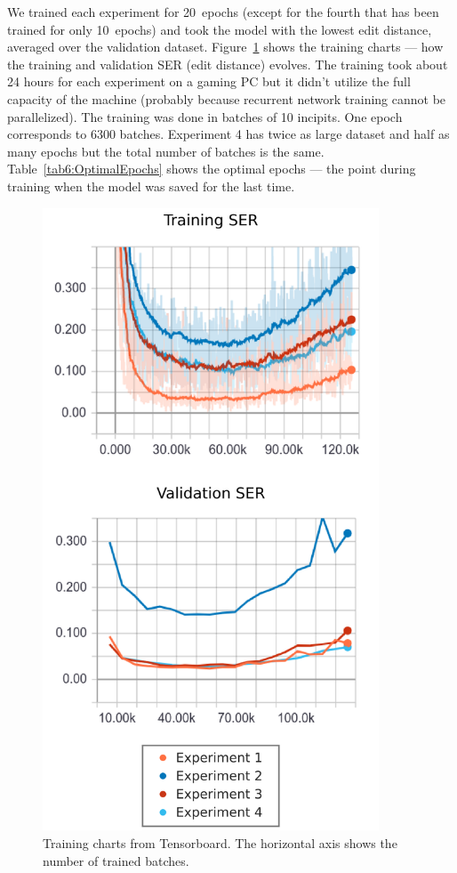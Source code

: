 We trained each experiment for 20~epochs (except for the fourth that has been trained for only 10~epochs) and took the model with the lowest edit distance, averaged over the validation dataset. Figure~\ref{fig6:TrainingCharts} shows the training charts --- how the training and validation SER (edit distance) evolves. The training took about 24 hours for each experiment on a gaming PC but it didn't utilize the full capacity of the machine (probably because recurrent network training cannot be parallelized). The training was done in batches of 10 incipits. One epoch corresponds to 6300 batches. Experiment 4 has twice as large dataset and half as many epochs but the total number of batches is the same. Table~\ref{tab6:OptimalEpochs} shows the optimal epochs --- the point during training when the model was saved for the last time.

\begin{figure}[p]
    \centering
    \includegraphics[width=100mm]{../img/training-charts}
    \caption{Training charts from Tensorboard. The horizontal axis shows the number of trained batches.}
    \label{fig6:TrainingCharts}
\end{figure}

